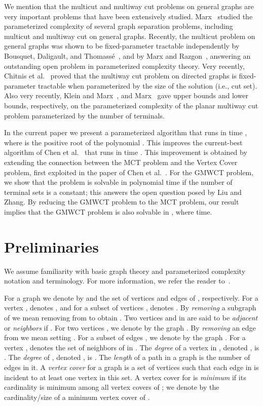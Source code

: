 \documentclass[11pt]{article}
\begin{document}
We mention that the {\sc multicut} and {\sc multiway cut} problems on general graphs are very important problems that have been extensively studied.
Marx~\cite{1140647} studied the parameterized complexity of several graph separation problems, including {\sc multicut} and {\sc multiway cut} on general graphs. Recently, the {\sc multicut} problem on general graphs was shown to be fixed-parameter tractable independently by Bousquet, Daligault, and Thomass\'{e}~\cite{newthomas}, and by Marx and Razgon~\cite{newmarx}, answering an outstanding open problem in parameterized complexity theory.
Very recently, Chitnis et al.~\cite{chitnis} proved that the {\sc multiway cut} problem on directed graphs is fixed-parameter tractable when parameterized by the size of the solution (i.e., cut set). Also very recently, Klein and Marx~\cite{kleinmarxplanar}, and Marx~\cite{marxplanar} gave upper bounds and lower bounds, respectively, on the parameterized complexity of the {\sc planar multiway cut} problem parameterized by the number of terminals.


In the current paper we present a parameterized algorithm that runs in time
, where  is the positive root of the polynomial .
This improves the current-best algorithm of Chen et al.~\cite{multicut} that runs in time . This improvement is obtained by extending the connection between the {\sc MCT} problem and the {\sc Vertex Cover} problem, first exploited in the paper of Chen et al.~\cite{multicut}. For the {\sc GMWCT} problem, we show that the problem is solvable in polynomial time if the number of terminal sets is a constant; this answers the open question posed by Liu and Zhang. By reducing the {\sc GMWCT} problem to the {\sc MCT} problem, our result implies that the {\sc GMWCT} problem is also solvable in , where  time.



\section{Preliminaries}
\label{sec:prelim}
We assume familiarity with basic graph theory and parameterized complexity notation and terminology. For more information, we refer the reader to~\cite{fptbook,grohe,rolf,west}.

For a graph  we denote by  and  the set of vertices and edges of , respectively. For a vertex ,  denotes , and for a subset of vertices ,  denotes . By {\em removing} a subgraph  of  we mean removing  from  to obtain . Two vertices  and  in  are said to be {\em adjacent} or {\em neighbors} if . For two vertices , we denote by  the graph . By {\em removing} an edge  from  we mean setting . For a subset of edges , we denote by  the graph . For a vertex ,  denotes the set of neighbors of  in . The {\em degree} of a vertex  in , denoted , is . The {\em degree} of , denoted , is . The {\em length} of a path in a graph  is the number of edges in it.
A {\em vertex cover} for a graph  is a set of vertices such that each edge in  is incident to at least one vertex in this set. A vertex cover for  is {\em minimum} if its cardinality is minimum among all vertex covers of ; we denote by  the cardinality/size of a minimum vertex cover of .
\end{document}
